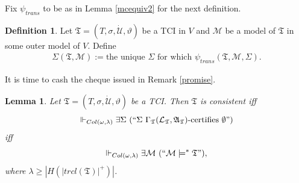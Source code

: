 \documentclass[12pt, twoside]{memoir}
\numberwithin{equation}{section}
\newtheorem{lem}[thm]{Lemma}
\theoremstyle{definition}
\newtheorem{defi}[thm]{Definition}
\theoremstyle{remark}
\theoremstyle{definition}
\theoremstyle{definition}
\theoremstyle{definition}
\theoremstyle{remark}
\begin{document}
Fix $\psi_{trans}$ to be as in Lemma \ref{mcequiv2} for the next definition. 

\begin{defi}
Let $\mathfrak{T} = (T, \sigma, \dot{\mathcal{U}}, \vartheta)$ be a TCI in $V$ and $\mathcal{M}$ be a model of $\mathfrak{T}$ in some outer model of $V$. Define \begin{align*}
    \Sigma(\mathfrak{T}, \mathcal{M}) := \text{the unique } \Sigma \text{ for which } \psi_{trans}(\mathfrak{T}, \mathcal{M}, \Sigma).
\end{align*}
\end{defi}

It is time to cash the cheque issued in Remark \ref{promise}.

\begin{lem}\label{conalt}
Let $\mathfrak{T} = (T, \sigma, \dot{\mathcal{U}}, \vartheta)$ be a TCI. Then $\mathfrak{T}$ is consistent iff $$\Vdash_{Col(\omega, \lambda)} \exists \Sigma \ (``\Sigma \ \Gamma_{\mathfrak{T}} (\mathcal{L}_{\mathfrak{T}}, \mathfrak{A}_{\mathfrak{T}})\text{-certifies } \emptyset")$$ iff
$$\Vdash_{Col(\omega, \lambda)} \exists \mathcal{M} \ (``\mathcal{M} \models^* \mathfrak{T}"),$$ where $\lambda \geq |H(|trcl(\mathfrak{T})|^+)|$.
\end{lem}
\end{document}
